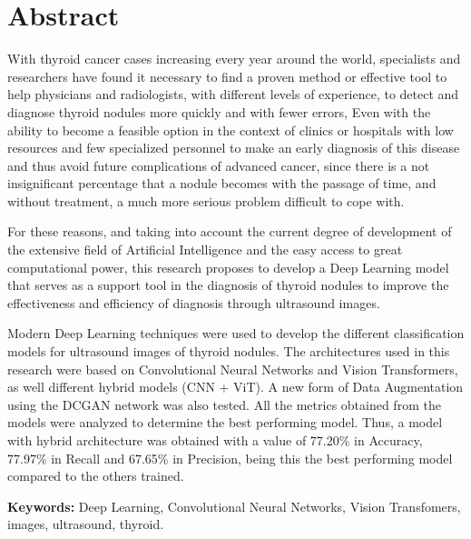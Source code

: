 \clearpage
\chapter*{Abstract}
With thyroid cancer cases increasing every year around the world,  specialists and researchers have found it necessary to find a proven method or effective tool to help physicians and radiologists, with different levels of experience, to detect and diagnose thyroid nodules more quickly and with fewer errors, Even with the ability to become a feasible option in the context of clinics or hospitals with low resources and few specialized personnel to make an early diagnosis of this disease and thus avoid future complications of advanced cancer, since there is a not insignificant percentage that a nodule becomes with the passage of time, and without treatment, a much more serious problem difficult to cope with. 

For these reasons, and taking into account the current degree of development of the extensive field of Artificial Intelligence and the easy access to great computational power, this research proposes to develop a Deep Learning model that serves as a support tool in the diagnosis of thyroid nodules to improve the effectiveness and efficiency of diagnosis through ultrasound images.

Modern Deep Learning techniques were used to develop the different classification models for ultrasound images of thyroid nodules. The architectures used in this research were based on Convolutional Neural Networks and Vision Transformers, as well different hybrid models (CNN + ViT). A new form of Data Augmentation using the DCGAN network was also tested. All the metrics obtained from the models were analyzed to determine the best performing model. Thus, a model with hybrid architecture was obtained with a value of 77.20\% in Accuracy, 77.97\% in Recall and 67.65\% in Precision, being this the best performing model compared to the others trained.
\newline

\textbf{Keywords: } Deep Learning, Convolutional Neural Networks, Vision Transfomers, images, ultrasound, thyroid.